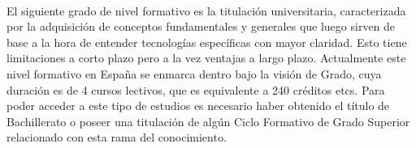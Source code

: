 \documentclass[12pt, a4paper]{report}
\begin{document}
        		\paragraph{}
                El siguiente grado de nivel formativo es la titulación universitaria, caracterizada por la adquisición de conceptos fundamentales y generales que luego sirven de base a la hora de entender tecnologías específicas con mayor claridad. Esto tiene limitaciones a corto plazo pero a la vez ventajas a largo plazo. Actualmente este nivel formativo en España se enmarca dentro bajo la visión de Grado, cuya duración es de 4 cursos lectivos, que es equivalente a 240 créditos etcs. Para poder acceder a este tipo de estudios es necesario haber obtenido el título de Bachillerato o poseer una titulación de algún Ciclo Formativo de Grado Superior relacionado con esta rama del conocimiento.
    		   
\end{document}

